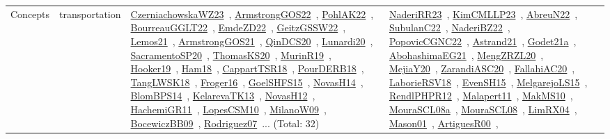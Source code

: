 {\begin{longtable}{lp{3cm}>{\raggedright\arraybackslash}p{6cm}>{\raggedright\arraybackslash}p{6cm}>{\raggedright\arraybackslash}p{8cm}}
Concepts & transportation & \href{works/CzerniachowskaWZ23.pdf}{CzerniachowskaWZ23}~\cite{CzerniachowskaWZ23}, \href{works/ArmstrongGOS22.pdf}{ArmstrongGOS22}~\cite{ArmstrongGOS22}, \href{works/PohlAK22.pdf}{PohlAK22}~\cite{PohlAK22}, \href{works/BourreauGGLT22.pdf}{BourreauGGLT22}~\cite{BourreauGGLT22}, \href{works/EmdeZD22.pdf}{EmdeZD22}~\cite{EmdeZD22}, \href{works/GeitzGSSW22.pdf}{GeitzGSSW22}~\cite{GeitzGSSW22}, \href{works/Lemos21.pdf}{Lemos21}~\cite{Lemos21}, \href{works/ArmstrongGOS21.pdf}{ArmstrongGOS21}~\cite{ArmstrongGOS21}, \href{works/QinDCS20.pdf}{QinDCS20}~\cite{QinDCS20}, \href{works/Lunardi20.pdf}{Lunardi20}~\cite{Lunardi20}, \href{works/SacramentoSP20.pdf}{SacramentoSP20}~\cite{SacramentoSP20}, \href{works/ThomasKS20.pdf}{ThomasKS20}~\cite{ThomasKS20}, \href{works/MurinR19.pdf}{MurinR19}~\cite{MurinR19}, \href{works/Hooker19.pdf}{Hooker19}~\cite{Hooker19}, \href{works/Ham18.pdf}{Ham18}~\cite{Ham18}, \href{works/CappartTSR18.pdf}{CappartTSR18}~\cite{CappartTSR18}, \href{works/PourDERB18.pdf}{PourDERB18}~\cite{PourDERB18}, \href{works/TangLWSK18.pdf}{TangLWSK18}~\cite{TangLWSK18}, \href{works/Froger16.pdf}{Froger16}~\cite{Froger16}, \href{works/GoelSHFS15.pdf}{GoelSHFS15}~\cite{GoelSHFS15}, \href{works/NovasH14.pdf}{NovasH14}~\cite{NovasH14}, \href{works/BlomBPS14.pdf}{BlomBPS14}~\cite{BlomBPS14}, \href{works/KelarevaTK13.pdf}{KelarevaTK13}~\cite{KelarevaTK13}, \href{works/NovasH12.pdf}{NovasH12}~\cite{NovasH12}, \href{works/HachemiGR11.pdf}{HachemiGR11}~\cite{HachemiGR11}, \href{works/LopesCSM10.pdf}{LopesCSM10}~\cite{LopesCSM10}, \href{works/MilanoW09.pdf}{MilanoW09}~\cite{MilanoW09}, \href{works/BocewiczBB09.pdf}{BocewiczBB09}~\cite{BocewiczBB09}, \href{works/Rodriguez07.pdf}{Rodriguez07}~\cite{Rodriguez07}... (Total: 32) & \href{works/NaderiRR23.pdf}{NaderiRR23}~\cite{NaderiRR23}, \href{works/KimCMLLP23.pdf}{KimCMLLP23}~\cite{KimCMLLP23}, \href{works/AbreuN22.pdf}{AbreuN22}~\cite{AbreuN22}, \href{works/SubulanC22.pdf}{SubulanC22}~\cite{SubulanC22}, \href{works/NaderiBZ22.pdf}{NaderiBZ22}~\cite{NaderiBZ22}, \href{works/PopovicCGNC22.pdf}{PopovicCGNC22}~\cite{PopovicCGNC22}, \href{works/Astrand21.pdf}{Astrand21}~\cite{Astrand21}, \href{works/Godet21a.pdf}{Godet21a}~\cite{Godet21a}, \href{works/AbohashimaEG21.pdf}{AbohashimaEG21}~\cite{AbohashimaEG21}, \href{works/MengZRZL20.pdf}{MengZRZL20}~\cite{MengZRZL20}, \href{works/MejiaY20.pdf}{MejiaY20}~\cite{MejiaY20}, \href{works/ZarandiASC20.pdf}{ZarandiASC20}~\cite{ZarandiASC20}, \href{works/FallahiAC20.pdf}{FallahiAC20}~\cite{FallahiAC20}, \href{works/LaborieRSV18.pdf}{LaborieRSV18}~\cite{LaborieRSV18}, \href{works/EvenSH15.pdf}{EvenSH15}~\cite{EvenSH15}, \href{works/MelgarejoLS15.pdf}{MelgarejoLS15}~\cite{MelgarejoLS15}, \href{works/RendlPHPR12.pdf}{RendlPHPR12}~\cite{RendlPHPR12}, \href{works/Malapert11.pdf}{Malapert11}~\cite{Malapert11}, \href{works/MakMS10.pdf}{MakMS10}~\cite{MakMS10}, \href{works/MouraSCL08a.pdf}{MouraSCL08a}~\cite{MouraSCL08a}, \href{works/MouraSCL08.pdf}{MouraSCL08}~\cite{MouraSCL08}, \href{works/LimRX04.pdf}{LimRX04}~\cite{LimRX04}, \href{works/Mason01.pdf}{Mason01}~\cite{Mason01}, \href{works/ArtiguesR00.pdf}{ArtiguesR00}~\cite{ArtiguesR00}, 
\end{longtable}}
